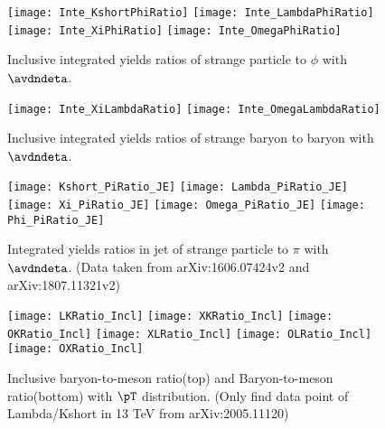 \begin{figure}[ht]
	\begin{center}
		\texttt{[image: Inte\_KshortPhiRatio]}
		\texttt{[image: Inte\_LambdaPhiRatio]}
		\texttt{[image: Inte\_XiPhiRatio]}
		\texttt{[image: Inte\_OmegaPhiRatio]}
	\end{center}
	\caption{Inclusive integrated yields ratios of strange particle to $\phi$ with $\avdndeta$.}
	\label{fig:InclIntePartoPhiRatio}
\end{figure}

\begin{figure}[ht]
	\begin{center}
		\texttt{[image: Inte\_XiLambdaRatio]}
		\texttt{[image: Inte\_OmegaLambdaRatio]}
	\end{center}
	\caption{Inclusive integrated yields ratios of strange baryon to baryon with $\avdndeta$.}
	\label{fig:InclBtoBRatio}
\end{figure}

\begin{figure}[ht]
	\begin{center}
		\texttt{[image: Kshort\_PiRatio\_JE]}
		\texttt{[image: Lambda\_PiRatio\_JE]}
		\texttt{[image: Xi\_PiRatio\_JE]}
		\texttt{[image: Omega\_PiRatio\_JE]}
		\texttt{[image: Phi\_PiRatio\_JE]}
	\end{center}
	\caption{Integrated yields ratios in jet of strange particle to $\pi$ with $\avdndeta$. (Data taken from arXiv:1606.07424v2 and arXiv:1807.11321v2)}
	\label{fig:JEIntePartoPiRatio}
\end{figure}


\begin{figure}[ht]
        \begin{center}
                \texttt{[image: LKRatio\_Incl]}
                \texttt{[image: XKRatio\_Incl]}
                \texttt{[image: OKRatio\_Incl]}
                \texttt{[image: XLRatio\_Incl]}
                \texttt{[image: OLRatio\_Incl]}
                \texttt{[image: OXRatio\_Incl]}
        \end{center}
	\caption{Inclusive baryon-to-meson ratio(top) and Baryon-to-meson ratio(bottom) with $\pT$ distribution. (Only find data point of Lambda/Kshort in 13 TeV from arXiv:2005.11120)}
        \label{fig:InclParRatio}
\end{figure}

